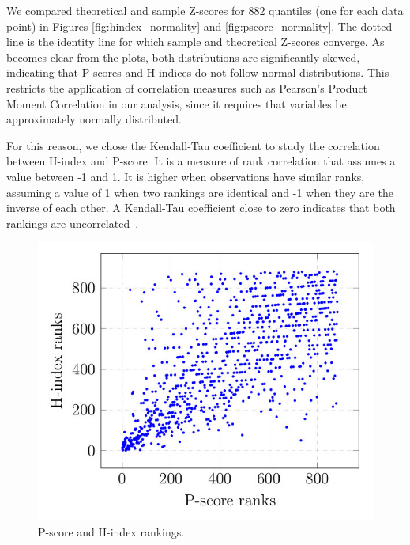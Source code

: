 \documentclass[man]{apa6}
\let \cite \parencite
\begin{document}
We compared theoretical and sample Z-scores for 882 quantiles (one for each data point) in Figures
\ref{fig:hindex_normality} and \ref{fig:pscore_normality}. The dotted line is the identity line for
which sample and theoretical Z-scores converge. As becomes clear from the plots, both distributions
are significantly skewed, indicating that P-scores and H-indices do not follow normal
distributions. This restricts the application of correlation measures such as Pearson's Product 
Moment Correlation in our analysis, since it requires that variables be approximately normally 
distributed. 

For this reason, we chose the Kendall-Tau coefficient to
study the correlation 
between H-index and P-score. It is a measure of rank
correlation that assumes a value between
-1 and 1. It is higher when observations have similar
ranks, assuming a value of 1
when two rankings are identical and -1 when they are the inverse of each other. 
A Kendall-Tau coefficient close to zero indicates
that both rankings are uncorrelated~\cite{Kendall1955, Baeza-Yates2011}.

\begin{figure}[h!]
  \begin{center}
    \centerline{\includegraphics[scale=0.4]{rankings}}
    \caption{P-score and H-index rankings.}
    \label{fig:pscore_hindex_ranks}
  \end{center}
\end{figure}
\end{document}
